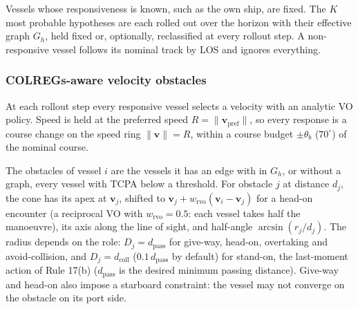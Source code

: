 \documentclass[10pt,a4paper]{article}
\begin{document}
Vessels whose responsiveness is known, such as the own ship, are fixed. The $K$
most probable hypotheses are each rolled out over the
horizon with their effective graph $G_h$, held fixed or, optionally,
reclassified at every rollout step. A non-responsive vessel follows its nominal
track by LOS and ignores everything.

\subsubsection{COLREGs-aware velocity obstacles}\label{sec:vo} At each rollout step
every responsive vessel selects a velocity with an analytic VO policy.  Speed is
held at the preferred speed $R=\|\bm v_{\text{pref}}\|$, so every response is a
course change on the speed ring $\|\bm v\|=R$, within a course budget
$\pm\theta_b$ ($70^\circ$) of the nominal course.

The obstacles of vessel $i$ are the vessels it has an edge with in $G_h$, or
without a graph, every vessel with TCPA below a threshold. For obstacle $j$ at
distance $d_j$, the cone has its apex at $\bm v_j$, shifted to $\bm v_j +
w_{\text{rvo}}(\bm v_i - \bm v_j)$ for a head-on encounter (a reciprocal
VO with $w_{\text{rvo}}=0.5$: each vessel takes half the
manoeuvre), its axis along the line of sight, and half-angle $\arcsin(r_j/d_j)$.
The radius depends on the role: $D_j = d_{\text{pass}}$ for give-way, head-on,
overtaking and avoid-collision, and $D_j = d_{\text{coll}}$
($0.1\,d_{\text{pass}}$ by default) for stand-on, the last-moment action of Rule
17(b) ($d_{\text{pass}}$ is the desired minimum passing distance). Give-way and head-on also impose a starboard constraint: the vessel may
not converge on the obstacle on its port side. 
\end{document}
